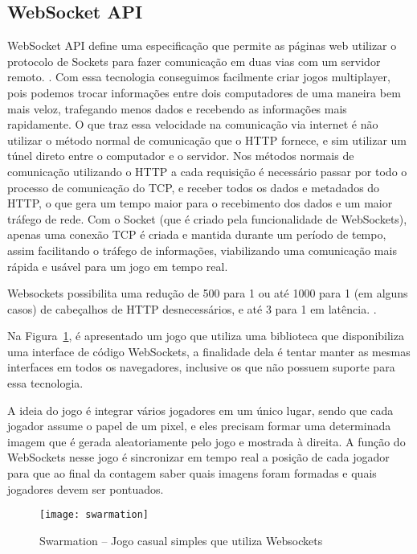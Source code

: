 \subsection{WebSocket API}

WebSocket API define uma especificação que permite as páginas web
utilizar o protocolo de Sockets para fazer comunicação em duas
vias com um servidor remoto. \cite{website:w3cwebsockets}. Com essa tecnologia
conseguimos facilmente criar jogos multiplayer, pois podemos
trocar informações entre dois computadores de uma maneira bem mais
veloz, trafegando menos dados e recebendo as informações mais
rapidamente.
O que traz essa velocidade na comunicação via internet é não utilizar
o método normal de comunicação que o HTTP fornece, e sim utilizar um
túnel direto entre o computador e o servidor.
Nos métodos normais de comunicação utilizando o HTTP a cada requisição
é necessário passar por todo o processo de comunicação do TCP, e
receber todos os dados e metadados do HTTP, o que gera um tempo maior para
o recebimento dos dados e um maior tráfego de rede. Com o Socket (que
é criado pela funcionalidade de WebSockets), apenas uma conexão TCP é
criada e mantida durante um período de tempo, assim facilitando o
tráfego de informações, viabilizando uma comunicação mais rápida e
usável para um jogo em tempo real.

Websockets possibilita uma redução de 500 para 1 ou até 1000 para 1
(em alguns casos) de cabeçalhos de HTTP desnecessários, e até 3 para 1
em latência. \cite{lubbers2010pro}.

Na Figura~\ref{img:swarmation}, é apresentado um jogo que utiliza
uma biblioteca que disponibiliza uma interface de código WebSockets,
a finalidade dela é tentar manter as mesmas interfaces em
todos os navegadores, inclusive os que não possuem suporte para essa
tecnologia.

A ideia do jogo é integrar vários jogadores em um único lugar, sendo que
cada jogador assume o papel de um pixel, e eles precisam formar uma
determinada imagem que é gerada aleatoriamente pelo jogo e mostrada à
direita. A função do WebSockets nesse jogo é sincronizar em tempo real a
posição de cada jogador para que ao final da contagem saber quais imagens
foram formadas e quais jogadores devem ser pontuados.

\begin{figure}[H]
  \centering
	\texttt{[image: swarmation]}
  \caption{Swarmation {--} Jogo casual simples que utiliza Websockets}
  \label{img:swarmation}
\end{figure}


